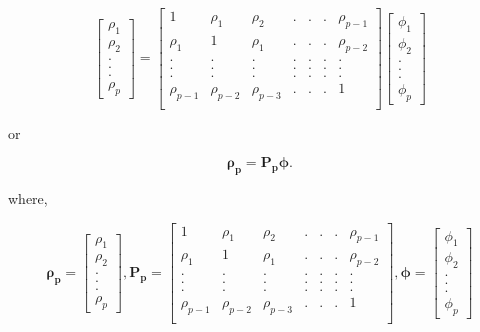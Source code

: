 \documentclass[
  11pt,
  a4paper,
]{report}
\begin{document}
\[\left[\begin{array}
{r}
\rho_1  \\
\rho_2  \\
.\\
.\\
.\\
\rho_p
\end{array}\right] = \left[\begin{array}
{rrrrrrr}
1 & \rho_1 & \rho_2 & .&.&.& \rho_{p-1} \\
\rho_1 & 1 & \rho_1 & .&.&.& \rho_{p-2} \\
. & . & . & .&.&.& . \\
. & . & . & .&.&.& . \\
. & . & . & .&.&.& . \\
\rho_{p-1} & \rho_{p-2} & \rho_{p-3} & .&.&.& 1 \\
\end{array}\right] \left[\begin{array}
{r}
\phi_1  \\
\phi_2  \\
.\\
.\\
.\\
\phi_p
\end{array}\right]
\]

or

\[\bm{\rho_p}=\bm{P_p\phi}.\]

where,

\[\bm{\rho_p} = \left[\begin{array}
{r}
\rho_1  \\
\rho_2  \\
.\\
.\\
.\\
\rho_p
\end{array}\right], \bm{P_p} = \left[\begin{array}
{rrrrrrr}
1 & \rho_1 & \rho_2 & .&.&.& \rho_{p-1} \\
\rho_1 & 1 & \rho_1 & .&.&.& \rho_{p-2} \\
. & . & . & .&.&.& . \\
. & . & . & .&.&.& . \\
. & . & . & .&.&.& . \\
\rho_{p-1} & \rho_{p-2} & \rho_{p-3} & .&.&.& 1 \\
\end{array}\right], \bm{\phi} = \left[\begin{array}
{r}
\phi_1  \\
\phi_2  \\
.\\
.\\
.\\
\phi_p
\end{array}\right]\]
\end{document}
